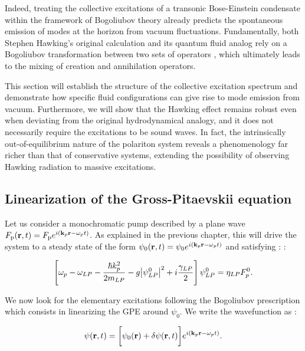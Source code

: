 Indeed, treating the collective excitations of a transonic Bose-Einstein condensate within the framework of Bogoliubov theory already predicts the spontaneous emission of modes at the horizon from vacuum fluctuations. Fundamentally, both Stephen Hawking's original calculation and its quantum fluid analog rely on a Bogoliubov transformation between two sets of operators \cite{hawking_black_1972}, which ultimately leads to the mixing of creation and annihilation operators.

This section will establish the structure of the collective excitation spectrum and demonstrate how specific fluid configurations can give rise to mode emission from vacuum. Furthermore, we will show that the Hawking effect remains robust even when deviating from the original hydrodynamical analogy, and it does not necessarily require the excitations to be sound waves. 
In fact, the intrinsically out-of-equilibrium nature of the polariton system reveals a phenomenology far richer than that of conservative systems, extending the possibility of observing Hawking radiation to massive excitations.



\subsection{Linearization of the Gross-Pitaevskii equation}
\label{sec:bogo_modes_derivation}
Let us consider a monochromatic pump described by a plane wave $F_{\mathrm{p}}(\mathbf{r},t)=F_{\mathrm{p}}e^{i(\mathbf{k}_p \mathbf{r} -\omega_pt)}$. As explained in the previous chapter, this will drive the system
to a steady state of the form $\psi_0(\mathbf{r},t)=\psi_0e^{i(\mathbf{k}_p \mathbf{r} -\omega_pt)}$ and satisfying : :

\begin{equation}
    \left[\omega_p -\omega_{LP} - \dfrac{\hbar k_p^2}{2 m_{LP}} - g \abs{\psi_{LP}^0}^2 + i \dfrac{\gamma_{LP}}{2} \right] \psi_{LP}^0= \eta_{LP} F_p^0.
    \label{eq:steady_state}
\end{equation}

We now look for the elementary excitations following the Bogoliubov prescription which consists in linearizing the GPE around $\psi_0$. We write the wavefunction as :

\begin{equation}
    \psi(\mathbf{r},t)=\biggl[\psi_0(\mathbf{r})+\delta\psi(\mathbf{r},t)\biggr]e^{i(\mathbf{k}_p \mathbf{r} -\omega_pt)}.
    \label{eq:linearization_ansatz}
\end{equation}

